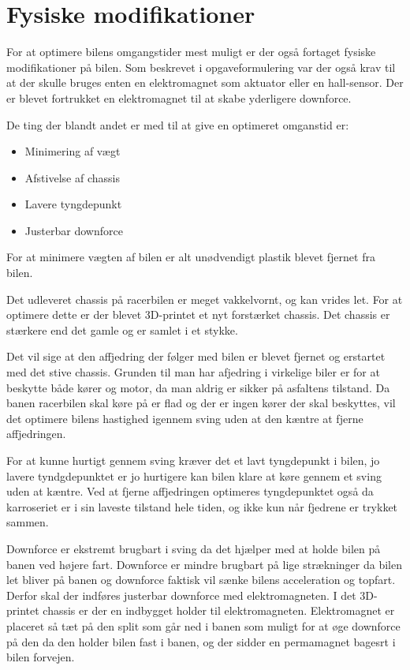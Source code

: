 \newpage
\section{Fysiske modifikationer}
For at optimere bilens omgangstider mest muligt er der også fortaget fysiske modifikationer på bilen. Som beskrevet i opgaveformulering var der også krav til at der skulle bruges enten en elektromagnet som aktuator eller en hall-sensor. Der er blevet fortrukket en elektromagnet til at skabe yderligere downforce.

De ting der blandt andet er med til at give en optimeret omganstid er:
\begin{itemize}
\item Minimering af vægt
\item Afstivelse af chassis
\item Lavere tyngdepunkt
\item Justerbar downforce
\end{itemize}
For at minimere vægten af bilen er alt unødvendigt plastik blevet fjernet fra bilen.

Det udleveret chassis på racerbilen er meget vakkelvornt, og kan vrides let. For at optimere dette er der blevet 3D-printet et nyt forstærket chassis. Det chassis er stærkere end det gamle og er samlet i et stykke.

Det vil sige at den affjedring der følger med bilen er blevet fjernet og erstartet med det stive chassis. Grunden til man har afjedring i virkelige biler er for at beskytte både kører og motor, da man aldrig er sikker på asfaltens tilstand. Da banen racerbilen skal køre på er flad og der er ingen kører der skal beskyttes, vil det optimere bilens hastighed igennem sving uden at den kæntre at fjerne affjedringen.

For at kunne hurtigt gennem sving kræver det et lavt tyngdepunkt i bilen, jo lavere tyndgdepunktet er jo hurtigere kan bilen klare at køre gennem et sving uden at kæntre. Ved at fjerne affjedringen optimeres tyngdepunktet også da karroseriet er i sin laveste tilstand hele tiden, og ikke kun når fjedrene er trykket sammen.

Downforce er ekstremt brugbart i sving da det hjælper med at holde bilen på banen ved højere fart. Downforce er mindre brugbart på lige strækninger da bilen let bliver på banen og downforce faktisk vil sænke bilens acceleration og topfart. Derfor skal der indføres justerbar downforce med elektromagneten. I det 3D-printet chassis er der en indbygget holder til elektromagneten. Elektromagnet er placeret så tæt på den split som går ned i banen som muligt for at øge downforce på den da den holder bilen fast i banen, og der sidder en permamagnet bagesrt i bilen forvejen.
